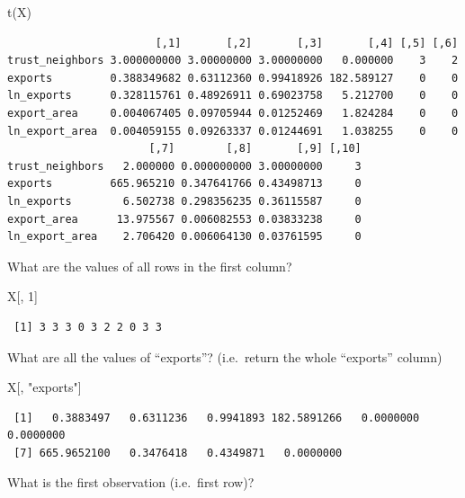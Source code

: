 \documentclass[
  letterpaper,
]{book}
\newenvironment{Shaded}{\begin{snugshade}}{\end{snugshade}}
\newcommand{\DecValTok}[1]{\textcolor[rgb]{0.68,0.00,0.00}{#1}}
\newcommand{\FunctionTok}[1]{\textcolor[rgb]{0.28,0.35,0.67}{#1}}
\newcommand{\NormalTok}[1]{\textcolor[rgb]{0.00,0.23,0.31}{#1}}
\newcommand{\StringTok}[1]{\textcolor[rgb]{0.13,0.47,0.30}{#1}}
\theoremstyle{definition}
\theoremstyle{definition}
\theoremstyle{plain}
\theoremstyle{definition}
\theoremstyle{plain}
\theoremstyle{plain}
\theoremstyle{remark}
\begin{document}
\begin{Shaded}
\begin{Highlighting}[]
\FunctionTok{t}\NormalTok{(X)}
\end{Highlighting}
\end{Shaded}

\begin{verbatim}
                       [,1]       [,2]       [,3]       [,4] [,5] [,6]
trust_neighbors 3.000000000 3.00000000 3.00000000   0.000000    3    2
exports         0.388349682 0.63112360 0.99418926 182.589127    0    0
ln_exports      0.328115761 0.48926911 0.69023758   5.212700    0    0
export_area     0.004067405 0.09705944 0.01252469   1.824284    0    0
ln_export_area  0.004059155 0.09263337 0.01244691   1.038255    0    0
                      [,7]        [,8]       [,9] [,10]
trust_neighbors   2.000000 0.000000000 3.00000000     3
exports         665.965210 0.347641766 0.43498713     0
ln_exports        6.502738 0.298356235 0.36115587     0
export_area      13.975567 0.006082553 0.03833238     0
ln_export_area    2.706420 0.006064130 0.03761595     0
\end{verbatim}

What are the values of all rows in the first column?

\begin{Shaded}
\begin{Highlighting}[]
\NormalTok{X[, }\DecValTok{1}\NormalTok{]}
\end{Highlighting}
\end{Shaded}

\begin{verbatim}
 [1] 3 3 3 0 3 2 2 0 3 3
\end{verbatim}

What are all the values of ``exports''? (i.e.~return the whole
``exports'' column)

\begin{Shaded}
\begin{Highlighting}[]
\NormalTok{X[, }\StringTok{"exports"}\NormalTok{]}
\end{Highlighting}
\end{Shaded}

\begin{verbatim}
 [1]   0.3883497   0.6311236   0.9941893 182.5891266   0.0000000   0.0000000
 [7] 665.9652100   0.3476418   0.4349871   0.0000000
\end{verbatim}

What is the first observation (i.e.~first row)?
\end{document}
